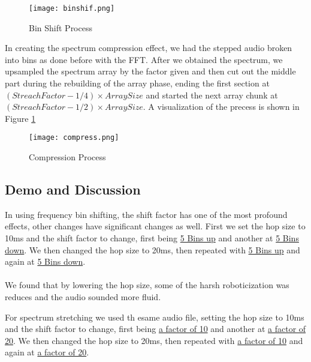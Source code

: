 \begin{figure}[ht]
	\centering
	\texttt{[image: binshif.png]}
	\caption{Bin Shift Process}
	\label{fig:bin-shift-block-diagram}
\end{figure}

In creating the spectrum compression effect, we had the stepped audio broken into bins as done before with the FFT. After we obtained the spectrum, we upsampled the spectrum array by the factor given and then cut out the middle part during the rebuilding of the array phase, ending the first section at $(StreachFactor-1/4) \times ArraySize$ and started the next array chunk at $(StreachFactor-1/2) \times ArraySize$. A visualization of the precess is shown in Figure \ref{fig:bin-shift-block-diagram}

\begin{figure}[ht]
	\centering
	\texttt{[image: compress.png]}
	\caption{Compression Process}
	\label{fig:compress-block-diagram}
\end{figure}


\subsection{Demo and Discussion}
In using frequency bin shifting, the shift factor has one of the most profound effects, other changes have significant changes as well. First we set the hop size to 10ms and the shift factor to change, first being
\href{run:../OutputAudio/FreqBinShift_22-001 Original Vocal_{N=10ms}{h=0.25}{s=5}.wav}{5 Bins up}
and another at
\href{run:../OutputAudio/FreqBinShift_22-001 Original Vocal_{N=10ms}{h=0.25}{s=-5}.wav}{5 Bins down}.
We then changed the hop size to 20ms, then repeated with 
\href{run:../OutputAudio/FreqBinShift_22-001 Original Vocal_{N=20ms}{h=0.25}{s=5}.wav}{5 Bins up}
and again at
\href{run:../OutputAudio/FreqBinShift_22-001 Original Vocal_{N=20ms}{h=0.25}{s=-5}.wav}{5 Bins down}.
\\ \\
We found that by lowering the hop size, some of the harsh roboticization was reduces and the audio sounded more fluid.

For spectrum stretching we used th esame audio file, setting the hop size to 10ms and the shift factor to change, first being
\href{run:../OutputAudio/Streatch_22-001 Original Vocal_{N=10ms}{h=0.25}{s=10}.wav}{a factor of 10}
and another at
\href{run:../OutputAudio/Streatch_22-001 Original Vocal_{N=10ms}{h=0.25}{s=20}.wav}{a factor of 20}.
We then changed the hop size to 20ms, then repeated with 
\href{run:../OutputAudio/Streatch_22-001 Original Vocal_{N=20ms}{h=0.25}{s=10}.wav}{a factor of 10}
and again at
\href{run:../OutputAudio/Streatch_22-001 Original Vocal_{N=20ms}{h=0.25}{s=20}.wav}{a factor of 20}.
\\ \\


